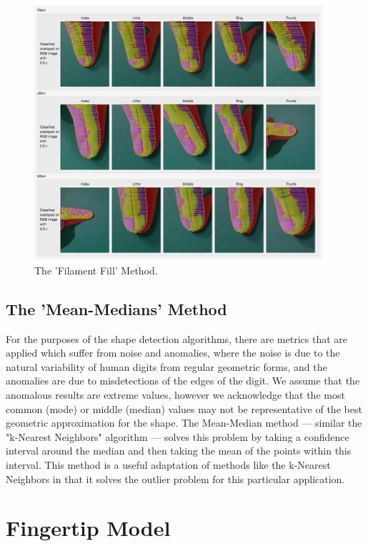\begin{figure}[h!]
  \centering
    \includegraphics[width=0.95\textwidth]{Chapter4/Figs/FillamentFill.jpg}
    \caption{The 'Filament Fill' Method.}\label{fig:FillamentFill}
\end{figure}

\subsection{The 'Mean-Medians' Method}\label{sec:MeanMedians}
For the purposes of the shape detection algorithms, there are metrics that are applied which suffer from noise and anomalies, where the noise is due to the natural variability of human digits from regular geometric forms, and the anomalies are due to misdetections of the edges of the digit. We assume that the anomalous results are extreme values, however we acknowledge that the most common (mode) or middle (median) values may not be representative of the best geometric approximation for the shape. The Mean-Median method --- similar the "k-Nearest Neighbors" algorithm --- solves this problem by taking a confidence interval around the median and then taking the mean of the points within this interval. This method is a useful adaptation of methods like the k-Nearest Neighbors in that it solves the outlier problem for this particular application.

\section{Fingertip Model}\label{sec:FingertipModel}

